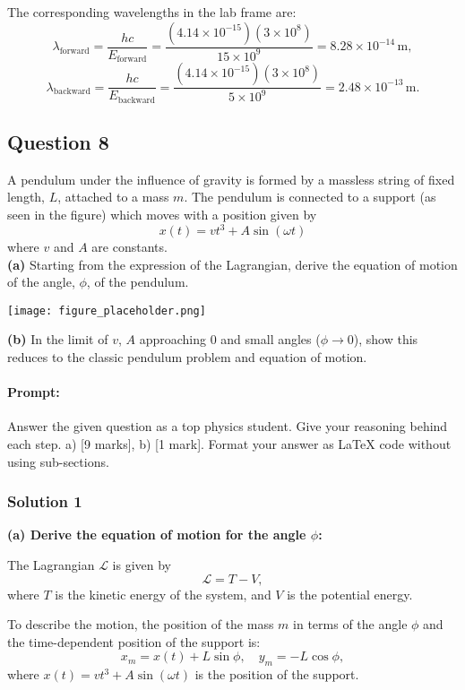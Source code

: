 \documentclass{article}
\begin{document}
The corresponding wavelengths in the lab frame are:
\[
\lambda_\text{forward} = \frac{hc}{E_\text{forward}} = \frac{(4.14 \times 10^{-15})(3 \times 10^8)}{15 \times 10^9} = 8.28 \times 10^{-14} \, \text{m},
\]
\[
\lambda_\text{backward} = \frac{hc}{E_\text{backward}} = \frac{(4.14 \times 10^{-15})(3 \times 10^8)}{5 \times 10^9} = 2.48 \times 10^{-13} \, \text{m}.
\]

\subsection{Question 8}

A pendulum under the influence of gravity is formed by a massless string of fixed length, $L$, attached to a mass $m$. The pendulum is connected to a support (as seen in the figure) which moves with a position given by
\[
x(t) = vt^3 + A\sin(\omega t)
\]
where $v$ and $A$ are constants. \\

\textbf{(a)} Starting from the expression of the Lagrangian, derive the equation of motion of the angle, $\phi$, of the pendulum.

\begin{center}
\texttt{[image: figure\_placeholder.png]}
\end{center}

\textbf{(b)} In the limit of $v$, $A$ approaching 0 and small angles ($\phi \to 0$), show this reduces to the classic pendulum problem and equation of motion.

\paragraph{Prompt: \\} 
Answer the given question as a top physics student. Give your reasoning behind each step. a) [9 marks], b) [1 mark].
Format your answer as LaTeX code without using sub-sections.

\subsubsection{Solution 1}
\textbf{(a) Derive the equation of motion for the angle $\phi$:}

The Lagrangian $\mathcal{L}$ is given by
\[
\mathcal{L} = T - V,
\]
where $T$ is the kinetic energy of the system, and $V$ is the potential energy. 

To describe the motion, the position of the mass $m$ in terms of the angle $\phi$ and the time-dependent position of the support is:
\[
x_m = x(t) + L\sin\phi, \quad y_m = -L\cos\phi,
\]
where $x(t) = vt^3 + A\sin(\omega t)$ is the position of the support.
\end{document}
